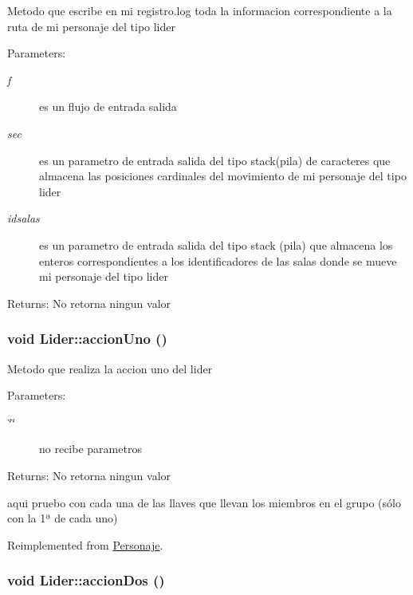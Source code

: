 Metodo que escribe en mi registro.log toda la informacion correspondiente a la ruta de mi personaje del tipo lider \begin{Desc}
\item[Parameters:]
\begin{description}
\item[{\em f}]es un flujo de entrada salida \item[{\em sec}]es un parametro de entrada salida del tipo stack(pila) de caracteres que almacena las posiciones cardinales del movimiento de mi personaje del tipo lider \item[{\em idsalas}]es un parametro de entrada salida del tipo stack (pila) que almacena los enteros correspondientes a los identificadores de las salas donde se mueve mi personaje del tipo lider \end{description}
\end{Desc}
\begin{Desc}
\item[Returns:]No retorna ningun valor \end{Desc}
\hypertarget{classLider_2729cb612e6ca2d2750f48b85743107e}{
\subsubsection[accionUno]{\setlength{\rightskip}{0pt plus 5cm}void Lider::accionUno ()}}
\label{classLider_2729cb612e6ca2d2750f48b85743107e}


Metodo que realiza la accion uno del lider \begin{Desc}
\item[Parameters:]
\begin{description}
\item[{\em \char`\"{}\char`\"{}}]no recibe parametros \end{description}
\end{Desc}
\begin{Desc}
\item[Returns:]No retorna ningun valor \end{Desc}


aqui pruebo con cada una de las llaves que llevan los miembros en el grupo (sólo con la 1ª de cada uno) 

Reimplemented from \hyperlink{classPersonaje_0454b75ccc8f7e33f03e2cfb2c59e725}{Personaje}.\hypertarget{classLider_51fb2d9c6dfe283a13d61b8f546068f3}{
\subsubsection[accionDos]{\setlength{\rightskip}{0pt plus 5cm}void Lider::accionDos ()}}
\label{classLider_51fb2d9c6dfe283a13d61b8f546068f3}


